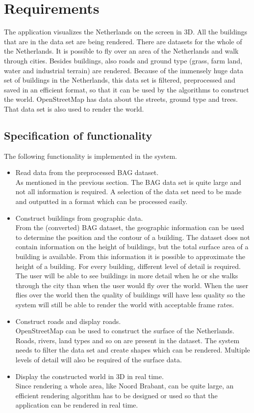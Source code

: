 \chapter{Requirements}
\label{chap:Requirements}
The application visualizes the Netherlands on the screen in 3D. All the buildings that are in the data set are being rendered. There are datasets for the whole of the Netherlands. It is possible to fly over an area of the Netherlands and walk through cities. Besides buildings, also roads and ground type (grass, farm land, water and industrial terrain) are rendered.
Because of the immensely huge data set of buildings in the Netherlands, this data set is filtered, preprocessed and saved in an efficient format, so that it can be used by the algorithms to construct the world. OpenStreetMap has data about the streets, ground type and trees. That data set is also used to render the world.

\section{Specification of functionality}
\label{sec:SpecificationOfFunctionality}
The following functionality is implemented in the system.
\begin{itemize}
  \item Read data from the preprocessed BAG dataset.\\
      As mentioned in the previous section. The BAG data set is quite large and not all information is required. A selection of the data set need to be made and outputted in a format which can be processed easily.
    \item Construct buildings from geographic data. \\
       From the (converted) BAG dataset, the geographic information can be used to determine the position and the contour of a building. The dataset does not contain information on the height of buildings, but the total surface area of a building is available. From this information it is possible to approximate the height of a building. For every building, different level of detail is required. The user will be able to see buildings in more detail when he or she walks through the city than when the user would fly over the world. When the user flies over the world then the quality of buildings will have less quality so the system will still be able to render the world with acceptable frame rates.
  \item Construct roads and display roads.\\
  OpenStreetMap can be used to construct the surface of the Netherlands. Roads, rivers, land types and so on are present in the dataset. The system needs to filter the data set and create shapes which can be rendered. Multiple levels of detail will also be required of the surface data.
  \item Display the constructed world in 3D in real time.\\
      Since rendering a whole area, like Noord Brabant, can be quite large, an efficient rendering algorithm has to be designed or used so that the application can be rendered in real time.
\end{itemize}

